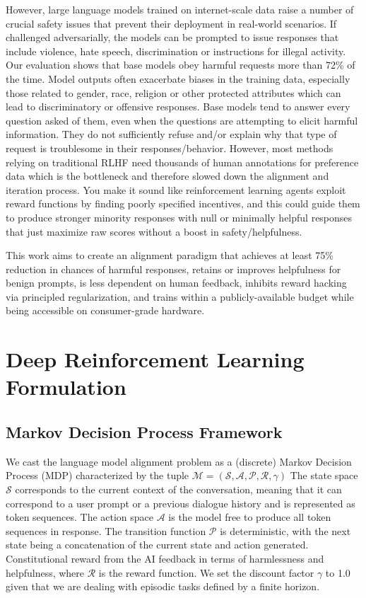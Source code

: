 \documentclass[conference]{IEEEtran}
\begin{document}
However, large language models trained on internet-scale data raise a number of crucial safety issues that prevent their deployment in real-world scenarios. If challenged adversarially, the models can be prompted to issue responses that include violence, hate speech, discrimination or instructions for illegal activity. Our evaluation shows that base models obey harmful requests more than 72\% of the time. Model outputs often exacerbate biases in the training data, especially those related to gender, race, religion or other protected attributes which can lead to discriminatory or offensive responses. Base models tend to answer every question asked of them, even when the questions are attempting to elicit harmful information. They do not sufficiently refuse and/or explain why that type of request is troublesome in their responses/behavior. However, most methods relying on traditional RLHF need thousands of human annotations for preference data which is the bottleneck and therefore slowed down the alignment and iteration process. You make it sound like reinforcement learning agents exploit reward functions by finding poorly specified incentives, and this could guide them to produce stronger minority responses with null or minimally helpful responses that just maximize raw scores without a boost in safety/helpfulness.

This work aims to create an alignment paradigm that achieves at least 75\% reduction in chances of harmful responses, retains or improves helpfulness for benign prompts, is less dependent on human feedback, inhibits reward hacking via principled regularization, and trains within a publicly-available budget while being accessible on consumer-grade hardware.


\section{Deep Reinforcement Learning Formulation}

\subsection{Markov Decision Process Framework}

We cast the language model alignment problem as a (discrete) Markov Decision Process (MDP) characterized by the tuple $\mathcal{M} = (\mathcal{S}, \mathcal{A}, \mathcal{P}, \mathcal{R}, {\gamma})$ The state space $\mathcal{S}$ corresponds to the current context of the conversation, meaning that it can correspond to a user prompt or a previous dialogue history and is represented as token sequences. The action space $\mathcal{A}$ is the model free to produce all token sequences in response. The transition function $\mathcal{P}$ is deterministic, with the next state being a concatenation of the current state and action generated. Constitutional reward from the AI feedback in terms of harmlessness and helpfulness, where $\mathcal{R}$ is the reward function. We set the discount factor $\gamma$ to 1.0 given that we are dealing with episodic tasks defined by a finite horizon.
\end{document}
